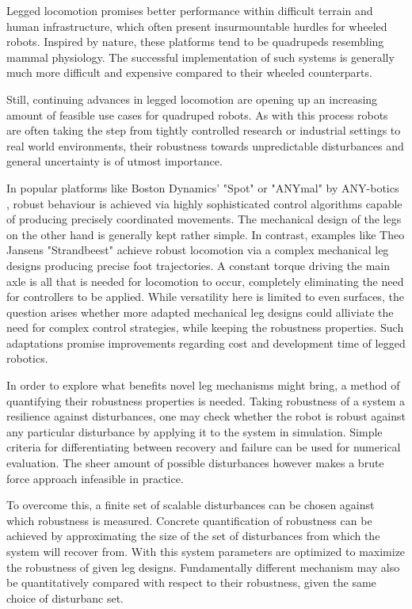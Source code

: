 Legged locomotion promises better performance within difficult terrain and human infrastructure, which often present insurmountable hurdles for wheeled robots. Inspired by nature, these platforms tend to be quadrupeds resembling mammal physiology. The successful implementation of such systems is generally much more difficult and expensive compared to their wheeled counterparts. 

Still, continuing advances in legged locomotion are opening up an increasing amount of feasible use cases for quadruped robots. As with this process robots are often taking the step from tightly controlled research or industrial settings to real world environments, their robustness towards unpredictable disturbances and general uncertainty is of utmost importance. 

In popular platforms like Boston Dynamics' "Spot" \cite{spot} or "ANYmal" by ANY-botics \cite{anymal}, robust behaviour is achieved via highly sophisticated control algorithms capable of producing precisely coordinated movements. The mechanical design of the legs on the other hand is generally kept rather simple. In contrast, examples like Theo Jansens "Strandbeest" \cite{jansen} achieve robust locomotion via a complex mechanical leg designs producing precise foot trajectories. A constant torque driving the main axle is all that is needed for locomotion to occur, completely eliminating the need for controllers to be applied.   
While versatility here is limited to even surfaces, the question arises whether more adapted mechanical leg designs could alliviate the need for complex control strategies, while keeping the robustness properties. Such adaptations promise improvements regarding cost and development time of legged robotics.

In order to explore what benefits novel leg mechanisms might bring, a method of quantifying their robustness properties is needed. Taking robustness of a system a resilience against disturbances, one may check whether the robot is robust against any particular disturbance by applying it to the system in simulation. Simple criteria for differentiating between recovery and failure can be used for numerical evaluation. The sheer amount of possible disturbances however makes a brute force approach infeasible in practice. 

To overcome this, a finite set of scalable disturbances can be chosen against which robustness is measured. Concrete quantification of robustness can be achieved by approximating the size of the set of disturbances from which the system will recover from. 
With this system parameters are optimized to maximize the robustness of given leg designs. Fundamentally different mechanism may also be quantitatively compared with respect to their robustness, given the same choice of disturbanc set.

